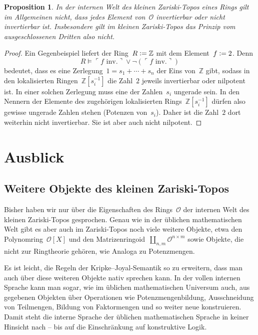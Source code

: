 \documentclass[a4paper,ngerman,12pt]{scrartcl}
\theoremstyle{definition}
\theoremstyle{plain}
\newtheorem{prop}[defn]{Proposition}
\theoremstyle{remark}
\newcommand{\ZZ}{\mathbb{Z}}
\renewcommand{\O}{\mathcal{O}}
\renewcommand{\_}{\mathpunct{.}\,}
\newcommand{\?}{\,{:}\,}
\newcommand{\speak}[1]{\ulcorner\text{#1}\urcorner}
\newcommand{\defeq}{\vcentcolon=}
\begin{document}
\begin{prop}In der internen Welt des kleinen Zariski-Topos eines Rings gilt im
Allgemeinen \emph{nicht}, dass jedes Element von~$\O$ invertierbar oder nicht
invertierbar ist. Insbesondere gilt im kleinen Zariski-Topos das Prinzip vom ausgeschlossenen Dritten
also \emph{nicht}.
\end{prop}
\begin{proof}Ein Gegenbeispiel liefert der Ring~$R \defeq \ZZ$ mit dem Element~$f
\defeq 2$. Denn
\[ R \models \speak{$f$ inv.} \vee \neg(\speak{$f$ inv.}) \]
bedeutet, dass es eine Zerlegung~$1 = s_1 + \cdots + s_n$ der Eins
von~$\ZZ$ gibt, sodass in den lokalisierten Ringen~$\ZZ[s_i^{-1}]$ die Zahl~$2$
jeweils invertierbar oder nilpotent ist. In einer solchen Zerlegung muss eine der Zahlen~$s_i$ ungerade
sein. In den Nennern der Elemente des zugehörigen lokalisierten
Rings~$\ZZ[s_i^{-1}]$ dürfen also gewisse ungerade Zahlen stehen (Potenzen
von~$s_i$). Daher ist die Zahl~$2$ dort weiterhin nicht invertierbar. Sie ist
aber auch nicht nilpotent.
\end{proof}


\section{Ausblick}

\subsection*{Weitere Objekte des kleinen Zariski-Topos}

Bisher haben wir nur über die Eigenschaften des Rings~$\O$ der internen Welt
des kleinen Zariski-Topos gesprochen. Genau wie in der üblichen mathematischen
Welt gibt es aber auch im Zariski-Topos noch viele weitere Objekte, etwa
den Polynomring~$\O[X]$ und den Matrizenringoid~$\amalg_{n,m} \O^{n \times
m}$ sowie Objekte, die nicht zur Ringtheorie gehören, wie
Analoga zu Potenzmengen.

Es ist leicht, die Regeln der Kripke--Joyal-Semantik so zu erweitern, dass man
auch über diese weiteren Objekte nativ sprechen kann. In der vollen internen
Sprache kann man sogar, wie im üblichen mathematischen Universum auch, aus
gegebenen Objekten über Operationen wie Potenzmengenbildung, Ausschneidung von
Teilmengen, Bildung von Faktormengen und so weiter neue konstruieren. Damit
steht die interne Sprache der üblichen mathematischen Sprache in keiner
Hinsicht nach -- bis auf die Einschränkung auf konstruktive Logik.
\end{document}
